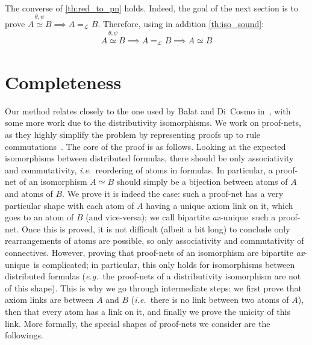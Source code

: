 \documentclass{lmcs}
\newcommand*{\ie}{\emph{i.e.}}
\newcommand*{\eg}{\emph{e.g.}}
\newcommand*{\iso}{\mathrel{\simeq}} %
\newcommand*{\Eu}{\mathcal{L}} %
\newcommand*{\eqeq}{=} %
\newcommand*{\eqEu}[1][]{\eqeq_{\Eu_{#1}}} %
\newcommand{\isoproofs}[4]{\overset{\ensuremath{#3,#4}}{#1\iso #2}}
\newcommand*{\unique}{\textit{ax}-unique}
\begin{document}
\begin{rem}
\label{rem:iso_iso_pn}
The converse of \autoref{th:red_to_pn} holds.
Indeed, the goal of the next section is to prove $\isoproofs{A}{B}{\theta}{\psi} \implies A\eqEu B$.
Therefore, using in addition \autoref{th:iso_sound}:
\[\isoproofs{A}{B}{\theta}{\psi} \implies A\eqEu B \implies A\iso B\]
\end{rem}


\section{Completeness}
\label{sec:complet_unit-free}

Our method relates closely to the one used by Balat and Di~Cosmo in~\cite{mllisos}, with some more work due to the distributivity isomorphisms.
We work on proof-nets, as they highly simplify the problem by representing proofs up to rule commutations~\cite{mallpncom}.
The core of the proof is as follows.
Looking at the expected isomorphisms between distributed formulas, there should be only associativity and commutativity, \ie\ reordering of atoms in formulas.
In particular, a proof-net of an isomorphism $A \iso B$ should simply be a bijection between atoms of $A$ and atoms of $B$.
We prove it is indeed the case: such a proof-net has a very particular shape with each atom of $A$ having a unique axiom link on it, which goes to an atom of $B$ (and vice-versa); we call bipartite \unique\ such a proof-net.
Once this is proved, it is not difficult (albeit a bit long) to conclude only rearrangements of atoms are possible, so only associativity and commutativity of connectives.
However, proving that proof-nets of an isomorphism are bipartite \unique\ is complicated; in particular, this only holds for isomorphisms between distributed formulas (\eg\ the proof-nets of a distributivity isomorphism are not of this shape).
This is why we go through intermediate steps: we first prove that axiom links are between $A$ and $B$ (\ie\ there is no link between two atoms of $A$), then that every atom has a link on it, and finally we prove the unicity of this link.
More formally, the special shapes of proof-nets we consider are the followings.
\end{document}
